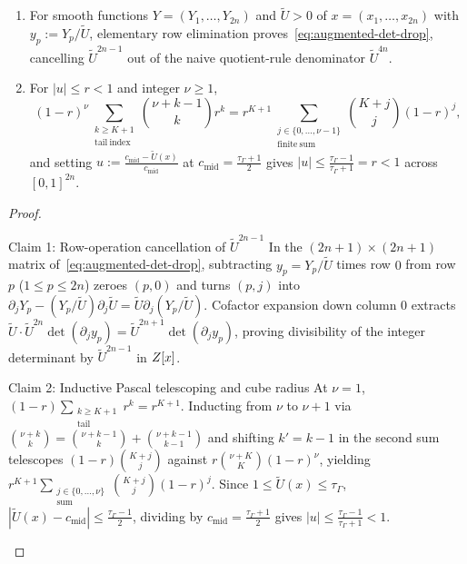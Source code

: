 \begin{lemma}
\label{lem:augmented-det-tail}
\leavevmode
\begin{enumerate}[label=(\arabic*),leftmargin=*]
  \item For smooth functions $Y = (Y_1,\dots,Y_{2n})$ and $\widetilde{U} > 0$ of $x = (x_1,\dots,x_{2n})$ with $y_p := Y_p/\widetilde{U}$, elementary row elimination proves~\eqref{eq:augmented-det-drop}, cancelling $\widetilde{U}^{2n-1}$ out of the naive quotient-rule denominator $\widetilde{U}^{4n}$.

  \item For $|u| \le r < 1$ and integer $\nu \ge 1$,
  \[
  (1-r)^\nu\sum_{\substack{k\ge K+1\\\mathrm{tail\ index}}}\binom{\nu+k-1}{k}r^k = r^{K+1}\sum_{\substack{j\in\{0,\dots,\nu-1\}\\\mathrm{finite\ sum}}}\binom{K+j}{j}(1-r)^j,
  \]
  and setting $u := \frac{c_{\mathrm{mid}}-\widetilde{U}(x)}{c_{\mathrm{mid}}}$ at $c_{\mathrm{mid}} = \frac{\tau_\Gamma+1}{2}$ gives $|u| \le \frac{\tau_\Gamma-1}{\tau_\Gamma+1} = r < 1$ across $[0,1]^{2n}$.
\end{enumerate}
\end{lemma}

\begin{proof}\leavevmode
\begin{proofpart}{Claim 1: Row-operation cancellation of $\widetilde{U}^{2n-1}$}
In the $(2n+1)\times(2n+1)$ matrix of~\eqref{eq:augmented-det-drop}, subtracting $y_p = Y_p/\widetilde{U}$ times row $0$ from row $p$ ($1 \le p \le 2n$) zeroes $(p,0)$ and turns $(p,j)$ into $\partial_j Y_p - (Y_p/\widetilde{U})\partial_j\widetilde{U} = \widetilde{U}\partial_j(Y_p/\widetilde{U})$. Cofactor expansion down column $0$ extracts $\widetilde{U}\cdot\widetilde{U}^{2n}\det(\partial_j y_p) = \widetilde{U}^{2n+1}\det(\partial_j y_p)$, proving divisibility of the integer determinant by $\widetilde{U}^{2n-1}$ in $Z[x]$.
\end{proofpart}
\begin{proofpart}{Claim 2: Inductive Pascal telescoping and cube radius}
At $\nu = 1$, $(1-r)\sum_{\substack{k\ge K+1\\\mathrm{tail}}}r^k = r^{K+1}$. Inducting from $\nu$ to $\nu+1$ via $\binom{\nu+k}{k} = \binom{\nu+k-1}{k} + \binom{\nu+k-1}{k-1}$ and shifting $k' = k-1$ in the second sum telescopes $(1-r)\binom{K+j}{j}$ against $r\binom{\nu+K}{K}(1-r)^\nu$, yielding $r^{K+1}\sum_{\substack{j\in\{0,\dots,\nu\}\\\mathrm{sum}}}\binom{K+j}{j}(1-r)^j$. Since $1 \le \widetilde{U}(x) \le \tau_\Gamma$, $|\widetilde{U}(x)-c_{\mathrm{mid}}| \le \frac{\tau_\Gamma-1}{2}$, dividing by $c_{\mathrm{mid}} = \frac{\tau_\Gamma+1}{2}$ gives $|u| \le \frac{\tau_\Gamma-1}{\tau_\Gamma+1} < 1$.
\end{proofpart}
\end{proof}

